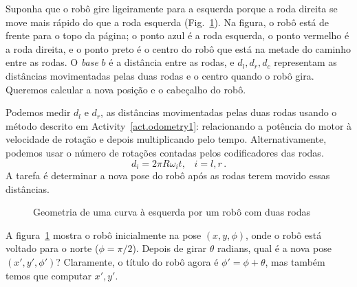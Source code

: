 {Suponha que o robô gire ligeiramente para a esquerda porque a roda direita se move mais rápido do que a roda esquerda (Fig.~\ref{fig.small-turn}). Na figura, o robô está de frente para o topo da página; o ponto azul é a roda esquerda, o ponto vermelho é a roda direita, e o ponto preto é o centro do robô que está na metade do caminho entre as rodas. O \textit{base} $b$ é a distância entre as rodas, e $d_l, d_r, d_c$ representam as distâncias movimentadas pelas duas rodas e o centro quando o robô gira. Queremos calcular a nova posição e o cabeçalho do robô.

Podemos medir $d_l$ e $d_r$, as distâncias movimentadas pelas duas rodas usando o método descrito em Activity~\ref{act.odometry1}: relacionando a potência do motor à velocidade de rotação e depois multiplicando pelo tempo. Alternativamente, podemos usar o número de rotações contadas pelos codificadores das rodas. 
\begin{equation}
d_i=2\pi R \omega_i t,\;\;\; i=l,r\,. \label{eq.rotation}
\end{equation}
A tarefa é determinar a nova pose do robô após as rodas terem movido essas distâncias.

\begin{figure}
\begin{center}
\end{center}
\caption{Geometria de uma curva à esquerda por um robô com duas rodas}\label{fig.small-turn}
\end{figure}

A figura~\ref{fig.small-turn} mostra o robô inicialmente na pose $(x,y,\phi)$, onde o robô está voltado para o norte ($\phi=\pi/2$). Depois de girar $\theta$ radians, qual é a nova pose $(x',y',\phi')$? Claramente, o título do robô agora é $\phi'=\phi+\theta$, mas também temos que computar $x',y'$.

}
